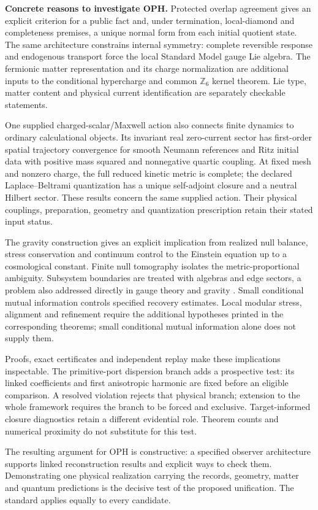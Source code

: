 \textbf{Concrete reasons to investigate OPH.}
Protected overlap agreement gives an explicit criterion for a public fact
and, under termination, local-diamond and completeness premises, a unique
normal form from each initial quotient state. The same architecture constrains
internal symmetry: complete reversible response and endogenous transport
force the local Standard Model gauge Lie algebra. The fermionic matter
representation and its charge normalization are additional inputs to the
conditional hypercharge and common $\mathbb Z_6$ kernel theorem. Lie type,
matter content and physical current identification are separately checkable
statements.

One supplied charged-scalar/Maxwell action also connects finite dynamics to
ordinary calculational objects. Its invariant real zero-current sector has
first-order spatial trajectory convergence for smooth Neumann references
and Ritz initial data with positive mass squared and nonnegative quartic
coupling. At fixed mesh and nonzero charge, the full reduced kinetic metric
is complete; the declared Laplace--Beltrami quantization has a unique
self-adjoint closure and a neutral Hilbert sector. These results concern the
same supplied action. Their physical couplings, preparation, geometry and
quantization prescription retain their stated input status.

The gravity construction gives an explicit implication from realized null
balance, stress conservation and continuum control to the Einstein equation
up to a cosmological constant. Finite null tomography isolates the
metric-proportional ambiguity. Subsystem boundaries are treated with algebras
and edge sectors, a problem also addressed directly in gauge theory and
gravity \cite{comparisonDonnellyFreidel}. Small conditional mutual information
controls specified recovery estimates. Local modular stress, alignment and
refinement require the additional hypotheses printed in the corresponding
theorems; small conditional mutual information alone does not supply them.

Proofs, exact certificates and independent replay make these implications
inspectable. The primitive-port dispersion branch adds a prospective test:
its linked coefficients and first anisotropic harmonic are fixed before an
eligible comparison. A resolved violation rejects that physical branch;
extension to the whole framework requires the branch to be forced and
exclusive. Target-informed closure diagnostics retain a different evidential
role. Theorem counts and numerical proximity do not substitute for this test.

The resulting argument for OPH is constructive: a specified observer
architecture supports linked reconstruction results and explicit ways to
check them. Demonstrating one physical realization carrying the records,
geometry, matter and quantum predictions is the decisive test of the proposed
unification. The standard applies equally to every candidate.
